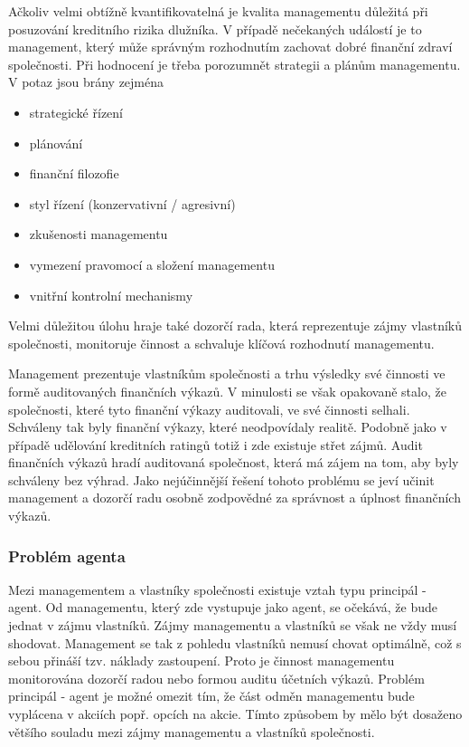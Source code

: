 \documentclass[a4paper]{book}
\begin{document}
Ačkoliv velmi obtížně kvantifikovatelná je kvalita managementu důležitá při posuzování kreditního rizika dlužníka. V případě nečekaných událostí je to management, který může správným rozhodnutím zachovat dobré finanční zdraví společnosti. Při hodnocení je třeba porozumnět strategii a plánům managementu. V potaz jsou brány zejména
\begin{itemize}
\item strategické řízení
\item plánování
\item finanční filozofie
\item styl řízení (konzervativní / agresivní)
\item zkušenosti managementu
\item vymezení pravomocí a složení managementu
\item vnitřní kontrolní mechanismy
\end{itemize}

Velmi důležitou úlohu hraje také dozorčí rada, která reprezentuje zájmy vlastníků společnosti, monitoruje činnost a schvaluje klíčová rozhodnutí managementu.

Management prezentuje vlastníkům společnosti a trhu výsledky své činnosti ve formě auditovaných finančních výkazů. V minulosti se však opakovaně stalo, že společnosti, které tyto finanční výkazy auditovali, ve své činnosti selhali. Schváleny tak byly finanční výkazy, které neodpovídaly realitě. Podobně jako v případě udělování kreditních ratingů totiž i zde existuje střet zájmů. Audit finančních výkazů hradí auditovaná společnost, která má zájem na tom, aby byly schváleny bez výhrad. Jako nejúčinnější řešení tohoto problému se jeví učinit management a dozorčí radu osobně zodpovědné za správnost a úplnost finančních výkazů.

\subsubsection{Problém agenta}

Mezi managementem a vlastníky společnosti existuje vztah typu principál - agent. Od managementu, který zde vystupuje jako agent, se očekává, že bude jednat v zájmu vlastníků. Zájmy managementu a vlastníků se však ne vždy musí shodovat. Management se tak z pohledu vlastníků nemusí chovat optimálně, což s sebou přináší tzv. náklady zastoupení. Proto je činnost managementu monitorována dozorčí radou nebo formou auditu účetních výkazů. Problém principál - agent je možné omezit tím, že část odměn managementu bude vyplácena v akciích popř. opcích na akcie. Tímto způsobem by mělo být dosaženo většího souladu mezi zájmy managementu a vlastníků společnosti.
\end{document}
